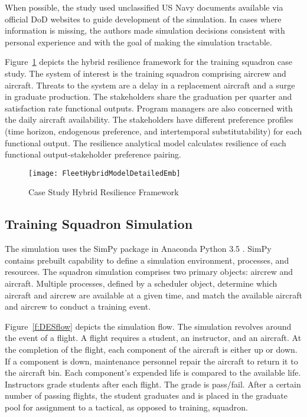 \documentclass[preprint,12pt]{elsarticle}
\begin{document}
When possible, the study used unclassified US Navy documents
available via official DoD websites to guide development of the
simulation. In cases where information is missing, the authors made
simulation decisions consistent with personal experience and with the
goal of making the simulation tractable.

Figure~\ref{f:FleetFramework} depicts the hybrid resilience framework
for the training squadron case study. The system of interest is the
training squadron comprising aircrew and aircraft. Threats to the
system are a delay in a replacement aircraft and a surge in graduate
production. The stakeholders share the graduation per quarter and
satisfaction rate functional outputs. Program managers are also
concerned with the daily aircraft availability. The stakeholders have
different preference profiles (time horizon, endogenous preference,
and intertemporal substitutability) for each functional output. The
resilience analytical model calculates resilience of each functional
output-stakeholder preference pairing.

\begin{figure}[h]
  \centering\texttt{[image: FleetHybridModelDetailedEmb]}
  \caption{Case Study Hybrid Resilience Framework}
  \label{f:FleetFramework}
\end{figure}


\subsection{Training Squadron Simulation}

The simulation uses the SimPy \cite{Scherfke2018} package in Anaconda
Python 3.5 \cite{Anaconda2016}. SimPy contains 
prebuilt capability to define a simulation environment, processes, and
resources. The squadron simulation comprises two primary objects: aircrew and
aircraft. Multiple processes, defined by a scheduler object, determine
which aircraft and aircrew are available at a given time, and match
the available aircraft and aircrew to conduct a training event.

Figure~\ref{f:DESflow} depicts the simulation flow. The simulation
revolves around the event of a flight.  A flight requires a student,
an instructor, and an aircraft. At the completion of the flight, each
component of the aircraft is either up or down. If a component is
down, maintenance personnel repair the aircraft to return it to the
aircraft bin. Each component's expended life is compared to the
available life. Instructors grade students after each flight. The
grade is pass/fail. After a certain number of passing flights, the
student graduates and is placed in the graduate pool for assignment to
a tactical, as opposed to training, squadron.
\end{document}
